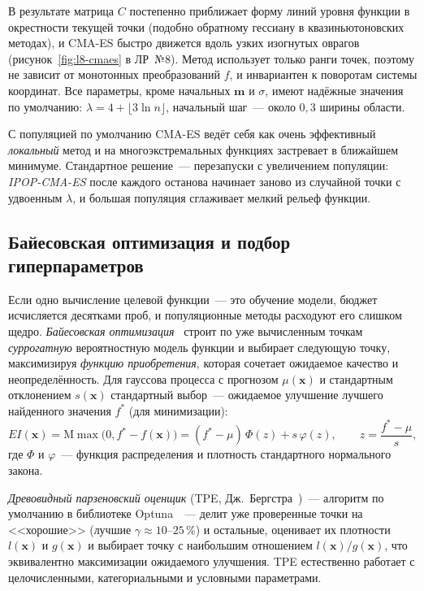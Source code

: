 В результате матрица $C$ постепенно приближает форму линий уровня функции в окрестности текущей точки
(подобно обратному гессиану в квазиньютоновских методах), и CMA-ES быстро движется вдоль узких
изогнутых оврагов (рисунок~\ref{fig:l8-cmaes} в ЛР~№8). Метод использует только ранги точек, поэтому
не зависит от монотонных преобразований $f$, и инвариантен к поворотам системы координат. Все
параметры, кроме начальных $\mathbf{m}$ и $\sigma$, имеют надёжные значения по умолчанию: $\lambda = 4 +
\lfloor 3\ln n\rfloor$, начальный шаг~--- около $0,3$ ширины области.

С популяцией по умолчанию CMA-ES ведёт себя как очень эффективный \emph{локальный} метод и на
многоэкстремальных функциях застревает в ближайшем минимуме. Стандартное решение~--- перезапуски с
увеличением популяции: \emph{IPOP-CMA-ES} после каждого останова начинает заново из случайной точки
с удвоенным $\lambda$, и большая популяция сглаживает мелкий рельеф функции.

\subsection{Байесовская оптимизация и подбор гиперпараметров}
\label{sec:bayes}

Если одно вычисление целевой функции~--- это обучение модели, бюджет исчисляется десятками проб, и
популяционные методы расходуют его слишком щедро. \emph{Байесовская оптимизация}~\cite{snoek2012} строит
по уже вычисленным точкам \emph{суррогатную} вероятностную модель функции и выбирает следующую точку,
максимизируя \emph{функцию приобретения}, которая сочетает ожидаемое качество и неопределённость. Для
гауссова процесса с прогнозом $\mu(\mathbf{x})$ и стандартным отклонением $s(\mathbf{x})$ стандартный
выбор~--- ожидаемое улучшение лучшего найденного значения $f^*$ (для минимизации):
\begin{equation}
\label{eq:ei}
EI(\mathbf{x}) = \mathrm{M}\max\bigl(0, f^* - f(\mathbf{x})\bigr) = (f^* - \mu)\,\Phi(z) + s\,\varphi(z),
\qquad z = \frac{f^* - \mu}{s},
\end{equation}
где $\Phi$ и $\varphi$~--- функция распределения и плотность стандартного нормального закона.

\emph{Древовидный парзеновский оценщик} (TPE, Дж.~Бергстра~\cite{bergstra2011})~--- алгоритм по умолчанию
в библиотеке Optuna~\cite{akiba2019}~--- делит уже проверенные точки на <<хорошие>> (лучшие $\gamma \approx
10$--$25$\,\%) и остальные, оценивает их плотности $l(\mathbf{x})$ и $g(\mathbf{x})$ и выбирает точку с
наибольшим отношением $l(\mathbf{x})/g(\mathbf{x})$, что эквивалентно максимизации ожидаемого улучшения.
TPE естественно работает с целочисленными, категориальными и условными параметрами.

